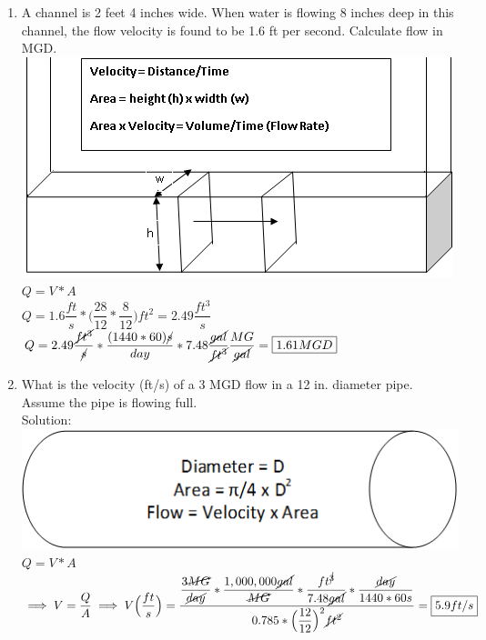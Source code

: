 \documentclass{article}
\begin{document}
\begin{enumerate}
\item A channel is 2 feet 4 inches wide. When water is flowing 8 inches deep in this channel, the flow velocity is found to be 1.6 ft per second. Calculate flow in MGD.\\
\vspace{0.3cm}
\includegraphics[scale=0.5]{ChannelFlow3}\\
\vspace{0.3cm}
$Q=V*A$\\
\vspace{0.3cm}
$Q=1.6\dfrac{ft}{s}*\Big(\dfrac{28}{12}*\dfrac{8}{12}\Big)ft^2=2.49\dfrac{ft^3}{s}$\\
$Q=2.49\dfrac{\cancel{ft^3}}{\cancel{s}}*\dfrac{(1440*60)\cancel{s}}{day}*7.48\dfrac{\cancel{gal}}{\cancel{ft^3}}\dfrac{MG}{\cancel{gal}}=\boxed{1.61MGD}$


\item What is the velocity (ft/s) of a 3 MGD flow in a 12 in. diameter pipe. Assume the pipe is flowing full.\\
Solution:\\
\vspace{0.3cm}
\includegraphics[scale=0.5]{PipeFlow}\\
$Q=V*A$\\
$\implies V=\dfrac{Q}{A} \implies V \Big(\dfrac{ft}{s}\Big)= \dfrac{\dfrac{3\cancel{MG}}{\cancel{day}}*\dfrac{1,000,000\cancel{gal}}{\cancel{MG}}*\dfrac{ft^{\cancel{3}}}{7.48\cancel{gal}}*\dfrac{\cancel{day}}{1440*60s}}{0.785*\Big(\dfrac{12}{12}\Big)^2\cancel{ft^2}}=\boxed{5.9ft/s}$




\end{enumerate}
\end{document}
